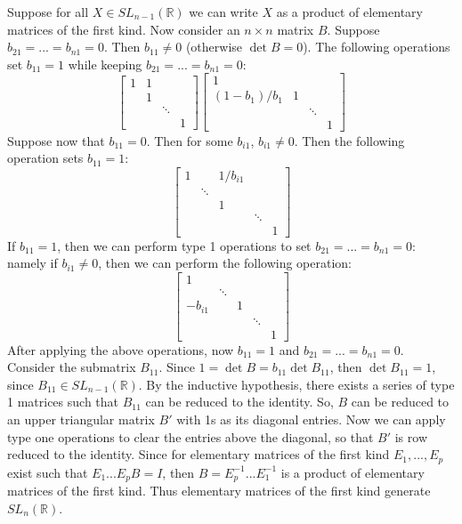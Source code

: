 \documentclass[12pt]{article}
\begin{document}
\begin{itemize}
\begin{itemize}
Suppose for all $X \in SL_{n-1}(\mathbb{R})$ we can write $X$ as a product of elementary matrices of the first kind. Now consider an $n \times n$ matrix $B$. Suppose $b_{21} = ... = b_{n1} = 0$. Then $b_{11} \neq 0$ (otherwise $\det B = 0$). The following operations set $b_{11} = 1$ while keeping $b_{21} = ... = b_{n1} = 0$:
$$ \begin{bmatrix}
1 & 1 \\
& 1 \\
& & \ddots \\
& & & 1
\end{bmatrix}\begin{bmatrix}
1 \\
(1-b_1)/b_1 & 1 \\
& & \ddots \\
& & & 1
\end{bmatrix}$$
Suppose now that $b_{11} = 0$. Then for some $b_{i1}$, $b_{i1} \neq 0$. Then the following operation sets $b_{11} = 1$:
$$\begin{bmatrix}
1 & & 1/b_{i1} \\
& \ddots \\
& & 1 \\
& & & \ddots \\
& & & & 1
\end{bmatrix}$$
If $b_{11} = 1$, then we can perform type 1 operations to set $b_{21} = ... = b_{n1} = 0$: namely if $b_{i1} \neq 0$, then we can perform the following operation:
$$\begin{bmatrix}
1 \\
& \ddots \\
-b_{i1} & & 1 \\
& & & \ddots \\
& & & & 1
\end{bmatrix}$$
After applying the above operations, now $b_{11} = 1$ and $b_{21} = ... = b_{n1} = 0$. Consider the submatrix $B_{11}$. Since $1 = \det B = b_{11}\det B_{11}$, then $\det B_{11} = 1$, since $B_{11} \in SL_{n-1}(\mathbb{R})$. By the inductive hypothesis, there exists a series of type 1 matrices such that $B_{11}$ can be reduced to the identity. So, $B$ can be reduced to an upper triangular matrix $B'$ with 1s as its diagonal entries. Now we can apply type one operations to clear the entries above the diagonal, so that $B'$ is row reduced to the identity. Since for elementary matrices of the first kind $E_1, ..., E_p$ exist such that $E_1...E_pB = I$, then $B = E_p^{-1}...E_1^{-1}$ is a product of elementary matrices of the first kind. Thus elementary matrices of the first kind generate $SL_n(\mathbb{R})$.

\end{itemize}
\end{itemize}
\end{document}
